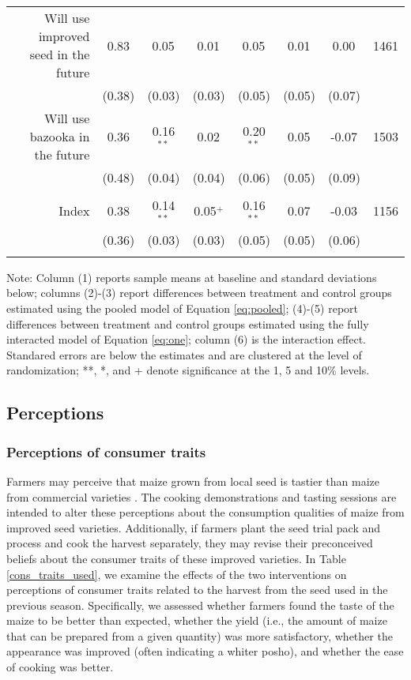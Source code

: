 \documentclass[english]{article}\usepackage[]{graphicx}\usepackage[]{xcolor}
\begin{document}
\begin{sidewaystable}
\begin{center}
\begin{tabular}{rccccccc}
Will use improved seed in the future
& 0.83
& 0.05$^{}$
& 0.01$^{}$ 
& 0.05$^{}$ 
& 0.01$^{}$
& 0.00$^{}$ & 1461 \\

& (0.38) & (0.03)  & (0.03) & (0.05)  & (0.05)  & (0.07)
 \\

Will use bazooka in the future
& 0.36
& 0.16$^{**}$
& 0.02$^{}$ 
& 0.20$^{**}$ 
& 0.05$^{}$
& -0.07$^{}$ & 1503 \\

& (0.48) & (0.04)  & (0.04) & (0.06)  & (0.05)  & (0.09)
 \\
\\

Index
& 0.38
& 0.14$^{**}$
& 0.05$^{+}$ 
& 0.16$^{**}$ 
& 0.07$^{}$
& -0.03$^{}$ & 1156 \\

& (0.36) & (0.03)  & (0.03) & (0.05)  & (0.05)  & (0.06)
 \\
\\
\hline\hline
\end{tabular}
\end{center}
\scriptsize
Note: Column (1) reports sample means at baseline and standard deviations below;  columns (2)-(3) report differences between treatment and control groups estimated using the pooled model of Equation  \ref{eq:pooled}; (4)-(5) report differences between treatment and control groups estimated using the fully interacted model of Equation \ref{eq:one}; column (6) is the interaction effect. Standared errors are below the estimates and are clustered at the level of randomization; **, *, and + denote significance at the 1, 5 and 10\% levels.
\end{sidewaystable}


\subsection{Perceptions}

\subsubsection{Perceptions of consumer traits}

Farmers may perceive that maize grown from local seed is tastier than
maize from commercial varieties \citep{picha2018preference}. The
cooking demonstrations and tasting sessions are intended to alter
these perceptions about the consumption qualities of maize from improved
seed varieties. Additionally, if farmers plant the seed trial pack
and process and cook the harvest separately, they may revise their
preconceived beliefs about the consumer traits of these improved varieties.
In Table \ref{cons_traits_used}, we examine the effects of the two
interventions on perceptions of consumer traits related to the harvest
from the seed used in the previous season. Specifically, we assessed
whether farmers found the taste of the maize to be better than expected,
whether the yield (i.e., the amount of maize that can be prepared
from a given quantity) was more satisfactory, whether the appearance
was improved (often indicating a whiter posho), and whether the ease
of cooking was better.
\end{document}

